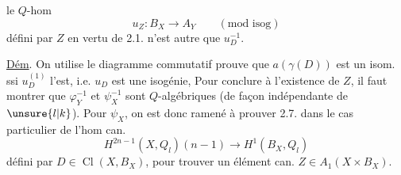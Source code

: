  le $Q$-hom 
\[
u_Z:B_X\longrightarrow A_Y\qquad(\text{mod isog})
\]
défini par $Z$ en vertu de 2.1. n'est autre que $u_D^{-1}$.

\uline{Dém}. On utilise le diagramme commutatif
 prouve que $a(\gamma(D))$ est un isom. ssi $u_D^{(1)}$ l'est, i.e. $u_D$ est une isogénie, Pour conclure à l'existence de $Z$, il faut montrer que $\varphi_Y^{-1}$ et $\psi_X^{-1}$ sont $Q$-algébriques (de façon indépendante de $\unsure{l|k}$).  Pour $\psi_X$, on est donc ramené à prouver 2.7. dans le cas particulier de l'hom can.
\[
H^{2n-1}(X,Q_l)(n-1)\longrightarrow H^1(B_X,Q_l)
\]
défini par $D\in\operatorname{Cl}(X,B_X)$, pour trouver un élément can. $Z\in A_1(X\times B_X)$.

